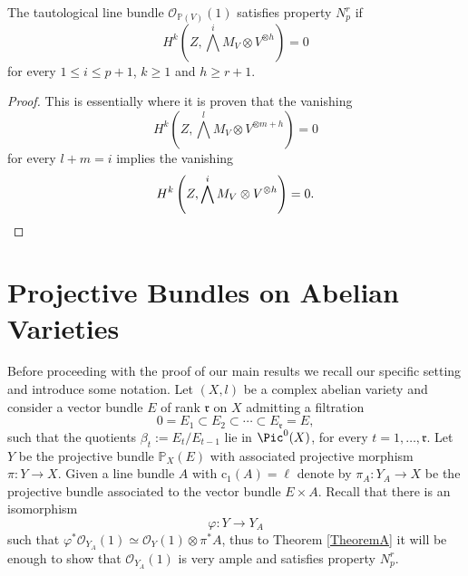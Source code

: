 \documentclass[11pt,letter]{amsart}
\numberwithin{equation}{section}
\begin{document}
\begin{prop}\label{PARK}
    The tautological line bundle $\mathcal{O}_{\mathbb{P}(V)}(1)$ satisfies property $N_p^r$
 if 
 \[H^k\left(Z,\bigwedge^iM_V\otimes V^{\otimes h}\right)=0\]
 for every $1\leq i\leq p+1 $, $k\geq 1$ and $h\geq r+1.$
 \end{prop}
 \begin{proof}
     This is essentially \cite[Prop. 3.2]{Park} where  it is proven that the vanishing 
      \[H^k\left(Z,\bigwedge^lM_V\otimes V^{\otimes m+h}\right)=0\]
      for every $l+m=i$ implies the vanishing
       \[H^k\left(Z,\bigwedge^iM_V\otimes V^{\otimes h}\right)=0. \qedhere\]
 \end{proof}
\section{Projective Bundles on Abelian Varieties}\label{sec4}
Before proceeding with the proof of our main results we recall our specific setting and introduce some notation. Let $(X,l)$ be a complex abelian variety and consider a vector bundle $E$ of rank $\mathfrak{r}$ on $X$ admitting a filtration
\begin{equation}\label{eq:filtration}
    0=E_1\subset E_2\subset\cdots\subset E_\mathfrak{r}=E,
\end{equation}
such that the quotients
$\beta_t:=E_t/E_{t-1}$ lie in $\Pic^0(X)$, for every $t=1,\ldots,\mathfrak{r}$.
Let $Y$ be the projective bundle $\mathbb{P}_X(E)$ with associated projective morphism $\pi:Y\rightarrow X$. Given a line bundle $A$ with $\mathrm{c}_1(A)=\ell$ denote by $\pi_A:Y_A\rightarrow X$ be the projective bundle associated to the vector bundle $E\times A$. Recall that there is an isomorphism 
\[\varphi:Y \rightarrow Y_A\]
such that $\varphi^*\mathcal{O}_{Y_A}(1)\simeq \mathcal{O}_{Y}(1)\otimes \pi^*A$, thus to Theorem \ref{TheoremA} it will be enough to show that $\mathcal{O}_{Y_A}(1)$ is very ample and satisfies property $N_p^r$. 
\end{document}
